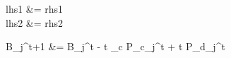 \documentclass{article}
\newenvironment{colalign}[1]{%
    \color{#1}
    \align
}{%
    \endalign
}
\begin{document}
    \begin{colalign}{red}
        lhs1 &= rhs1 \nonumber\\
        lhs2 &= rhs2 \nonumber
    \end{colalign}
    \begin{colalign}{blue}
			{B_{j}^{t+1}} &= { B_{j}^{t} - \Delta t  \eta_c P_{c_j}^t + \Delta t P_{d_j}^t } \\
    \end{colalign}
\end{document}
